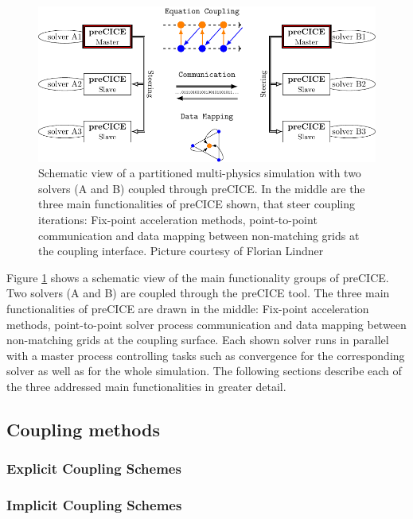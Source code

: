   \begin{figure}[htbp]
  	\centering
  	\includegraphics[width=0.97\linewidth]{figures/NewCommunicationScheme}
  	\caption{Schematic view of a partitioned multi-physics simulation with two solvers (A and B) coupled through preCICE. In the middle are the three main functionalities of preCICE shown, that steer coupling iterations: Fix-point acceleration methods, point-to-point communication and data mapping between non-matching grids at the coupling interface. Picture courtesy of Florian Lindner \cite{bungartz2015fully} }
  	\label{fig:precice}
  \end{figure}
  
  Figure \ref{fig:precice} shows a schematic view of the main functionality groups of preCICE. Two solvers (A and B) are coupled through the preCICE tool. The three main functionalities of preCICE are drawn in the middle: Fix-point acceleration methods, point-to-point solver process communication and data mapping between non-matching grids at the coupling surface. Each shown solver runs in parallel with a master process controlling tasks such as convergence for the corresponding solver as well as for the whole simulation. The following sections describe each of the three addressed main functionalities in greater detail.
  
 
 \subsection{Coupling methods} %
 
  \subsubsection{Explicit Coupling Schemes}
  
  \subsubsection{Implicit Coupling Schemes}
  
